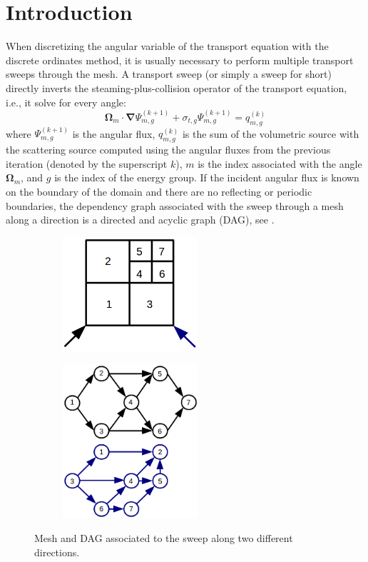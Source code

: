 \documentclass[letterpaper]{article}
\newcommand\bn{\boldsymbol{\nabla}}
\newcommand\bo{\boldsymbol{\Omega}}
\renewcommand{\(}{\left(}
\renewcommand{\)}{\right)}
\renewcommand{\[}{\left[}
\renewcommand{\]}{\right]}
\begin{document}
\section{Introduction}
When discretizing the angular variable of the transport equation with the
discrete ordinates method, it is usually necessary to perform multiple transport
sweeps through the mesh. A transport sweep (or simply a sweep for short)
directly inverts the steaming-plus-collision operator of the transport equation,
i.e., it solve for every angle:
\begin{equation}
  \bo_m\cdot\bn\Psi_{m,g}^{(k+1)}+\sigma_{t,g}\Psi_{m,g}^{(k+1)} =
  q_{m,g}^{(k)}
  \label{task}
\end{equation}
where $\Psi_{m,g}^{(k+1)}$ is the angular flux, $q_{m,g}^{(k)}$
is the sum of the volumetric source with the scattering source computed using
the angular fluxes from the
previous iteration (denoted by the superscript $k$), $m$ is the index associated
with the angle $\bo_m$, and $g$ is the index of the energy group. If the
incident angular flux is known on the boundary of the domain and there are no
reflecting or periodic boundaries, the dependency graph associated with the
sweep through a mesh along a direction is a directed and acyclic graph (DAG),
see .
\begin{figure}[H]
  \begin{subfigure}[c]{.5\textwidth}
    \centering
    \includegraphics[width=5cm]{task_1}
  \end{subfigure}
  \begin{subfigure}[c]{.5\textwidth}
    \centering
    \includegraphics[width=5cm]{task_2}
  \end{subfigure}
  \caption{Mesh and DAG associated to the sweep along two different directions.}
  \label{tasks}
\end{figure}
\end{document}
